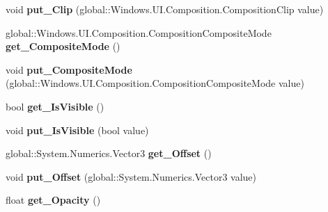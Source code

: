 \begin{DoxyCompactItemize}
void {\bfseries put\+\_\+\+Clip} (global\+::\+Windows.\+U\+I.\+Composition.\+Composition\+Clip value)
\item 
\mbox{\label{interface_windows_1_1_u_i_1_1_composition_1_1_i_visual_a8d4c301ec2cd6a02a533dd5077a01dcf}} 
global\+::\+Windows.\+U\+I.\+Composition.\+Composition\+Composite\+Mode {\bfseries get\+\_\+\+Composite\+Mode} ()
\item 
\mbox{\label{interface_windows_1_1_u_i_1_1_composition_1_1_i_visual_a23a31d796c4457b2e748aa0b505ad7c8}} 
void {\bfseries put\+\_\+\+Composite\+Mode} (global\+::\+Windows.\+U\+I.\+Composition.\+Composition\+Composite\+Mode value)
\item 
\mbox{\label{interface_windows_1_1_u_i_1_1_composition_1_1_i_visual_a40a0aa33cd325b0495e9d619fa205241}} 
bool {\bfseries get\+\_\+\+Is\+Visible} ()
\item 
\mbox{\label{interface_windows_1_1_u_i_1_1_composition_1_1_i_visual_a0050bae560148650b7020aec205c3506}} 
void {\bfseries put\+\_\+\+Is\+Visible} (bool value)
\item 
\mbox{\label{interface_windows_1_1_u_i_1_1_composition_1_1_i_visual_aa330691d0b439cb6f52bd0f8ee1acc4f}} 
global\+::\+System.\+Numerics.\+Vector3 {\bfseries get\+\_\+\+Offset} ()
\item 
\mbox{\label{interface_windows_1_1_u_i_1_1_composition_1_1_i_visual_ab591b5dd5dce0a9cdfa72e957ce3731e}} 
void {\bfseries put\+\_\+\+Offset} (global\+::\+System.\+Numerics.\+Vector3 value)
\item 
\mbox{\label{interface_windows_1_1_u_i_1_1_composition_1_1_i_visual_ac8734d1872440f36e957ad510227446a}} 
float {\bfseries get\+\_\+\+Opacity} ()
\item 
\mbox{\label{interface_windows_1_1_u_i_1_1_composition_1_1_i_visual_ad61a737c8ccc4148e0134f10292f5708}} 

\end{DoxyCompactItemize}

